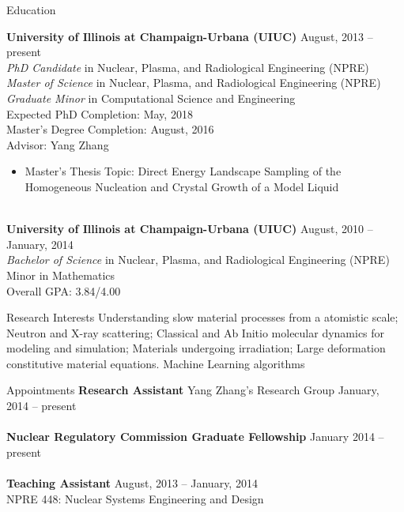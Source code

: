 \documentclass[10pt]{resume} %
\begin{document}

\begin{rSection}{Education}

{\bf University of Illinois at Champaign-Urbana (UIUC)} \hfill {August, 2013 -- present} \\
{\it{PhD Candidate}} in Nuclear, Plasma, and Radiological Engineering (NPRE) \\
{\it{Master of Science}} in Nuclear, Plasma, and Radiological Engineering (NPRE) \\
{\it{Graduate Minor}} in Computational Science and Engineering\\
Expected PhD Completion: May, 2018\\
Master's Degree Completion: August, 2016 \\
Advisor: Yang Zhang
\begin{itemize}
	\item Master's Thesis Topic: Direct Energy Landscape Sampling of the Homogeneous Nucleation and Crystal Growth of a Model Liquid
\end{itemize}
\hfill\\
{\bf University of Illinois at Champaign-Urbana (UIUC)} \hfill { August, 2010 -- January, 2014} \\ 
{\it Bachelor of Science} in Nuclear, Plasma, and Radiological Engineering (NPRE) \\
Minor in Mathematics \\
Overall GPA: 3.84/4.00
\smallskip \\


\end{rSection}

\begin{rSection}{Research Interests}
	Understanding slow material processes from a atomistic scale; Neutron and X-ray scattering; Classical and Ab Initio molecular dynamics for modeling and simulation; Materials undergoing irradiation; Large deformation constitutive material equations. Machine Learning algorithms
	\\
\end{rSection}


\begin{rSection}{Appointments}
	{\bf Research Assistant} Yang Zhang's Research Group \hfill {January, 2014 -- present} 
	\\
	\\
	{\bf Nuclear Regulatory Commission Graduate Fellowship} \hfill {January 2014 -- present}
	\\
	\\
	{\bf Teaching Assistant} \hfill {August, 2013 -- January, 2014} \\
	NPRE 448: Nuclear Systems Engineering and Design
	\\
\end{rSection}
\end{document}
